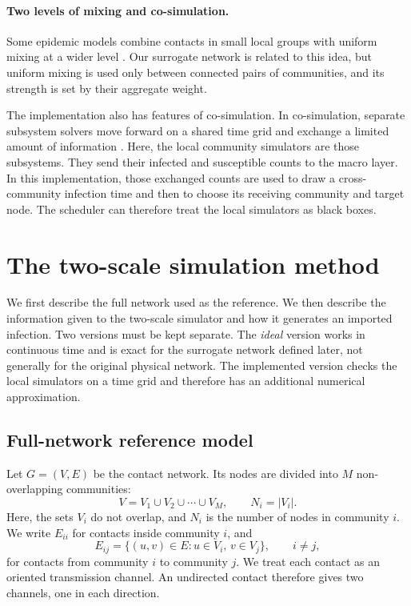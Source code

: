 \paragraph{Two levels of mixing and co-simulation.}
Some epidemic models combine contacts in small local groups with uniform mixing at a wider level \citep{ball1997}. Our surrogate network is related to this idea, but uniform mixing is used only between connected pairs of communities, and its strength is set by their aggregate weight.

The implementation also has features of co-simulation. In co-simulation, separate subsystem solvers move forward on a shared time grid and exchange a limited amount of information \citep{gomes2018cosim}. Here, the local community simulators are those subsystems. They send their infected and susceptible counts to the macro layer. In this implementation, those exchanged counts are used to draw a cross-community infection time and then to choose its receiving community and target node. The scheduler can therefore treat the local simulators as black boxes.

\clearpage

\section{The two-scale simulation method}
\label{sec:method}

We first describe the full network used as the reference. We then describe the information given to the two-scale simulator and how it generates an imported infection. Two versions must be kept separate. The \emph{ideal} version works in continuous time and is exact for the surrogate network defined later, not generally for the original physical network. The implemented version checks the local simulators on a time grid and therefore has an additional numerical approximation.

\subsection{Full-network reference model}
\label{sec:reference}

Let $G=(V,E)$ be the contact network. Its nodes are divided into $M$ non-overlapping communities:
\begin{equation}
\label{eq:partition}
V=V_1\cup V_2\cup\cdots\cup V_M,
\qquad N_i=|V_i|.
\end{equation}
Here, the sets $V_i$ do not overlap, and $N_i$ is the number of nodes in community $i$. We write $E_{ii}$ for contacts inside community $i$, and
\[
E_{ij}=\{(u,v)\in E:u\in V_i,\,v\in V_j\},
\qquad i\neq j,
\]
for contacts from community $i$ to community $j$. We treat each contact as an oriented transmission channel. An undirected contact therefore gives two channels, one in each direction.

